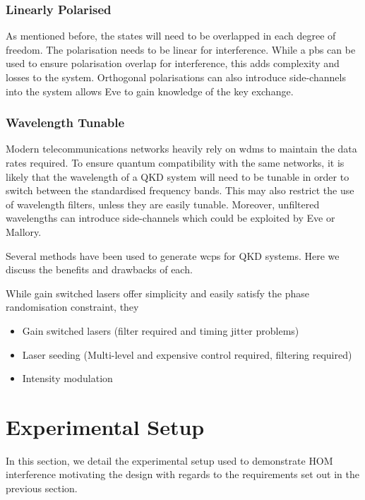 \subsubsection*{Linearly Polarised}

As mentioned before, the states will need to be overlapped in each degree of freedom. The polarisation needs to be linear for interference. While a \ac{pbs} can be used to ensure polarisation overlap for interference, this adds complexity and losses to the system. Orthogonal polarisations can also introduce side-channels into the system allows Eve to gain knowledge of the key exchange.

\subsubsection*{Wavelength Tunable}

Modern telecommunications networks heavily rely on \acp{wdm} to maintain the data rates required. To ensure quantum compatibility with the same networks, it is likely that the wavelength of a \ac{QKD} system will need to be tunable in order to switch between the standardised frequency bands. This may also restrict the use of wavelength filters, unless they are easily tunable. Moreover, unfiltered wavelengths can introduce side-channels which could be exploited by Eve or Mallory.

Several methods have been used to generate \acp{wcp} for \ac{QKD} systems. Here we discuss the benefits and drawbacks of each.

While gain switched lasers offer simplicity and easily satisfy the phase randomisation constraint, they  

\begin{itemize}
	\item Gain switched lasers (filter required and timing jitter problems)
	\item Laser seeding	(Multi-level and expensive control required, filtering required)
	\item Intensity modulation
\end{itemize}

\section{Experimental Setup}

In this section, we detail the experimental setup used to demonstrate \ac{HOM} interference motivating the design with regards to the requirements set out in the previous section. 


